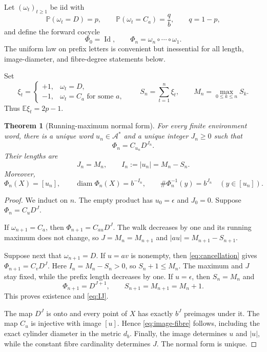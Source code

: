 \documentclass[11pt,a4paper]{amsart}
\newtheorem{theorem}{Theorem}[section]
\theoremstyle{definition}
\theoremstyle{remark}
\newcommand{\A}{\mathcal A}
\newcommand{\Prob}{\mathbb P}
\newcommand{\Exp}{\mathbb E}
\newcommand{\Id}{\operatorname{Id}}
\newcommand{\diam}{\operatorname{diam}}
\newcommand{\cyl}[1]{[#1]}
\begin{document}
Let $(\omega_t)_{t\geq1}$ be iid with
\begin{equation}\label{eq:environment-law}
 \Prob(\omega_t=D)=p,
 \qquad
 \Prob(\omega_t=C_a)=\frac{q}{b},
 \qquad q=1-p,
\end{equation}
and define the forward cocycle
\begin{equation}\label{eq:cocycle}
 \Phi_0=\Id,
 \qquad
 \Phi_n=\omega_n\circ\cdots\circ\omega_1.
\end{equation}
The uniform law on prefix letters is convenient but inessential for all
length, image-diameter, and fibre-degree statements below.

Set
\begin{equation}\label{eq:walk}
 \xi_t=\begin{cases}+1,&\omega_t=D,\\-1,&\omega_t=C_a\text{ for some }a,
 \end{cases}
 \qquad
 S_n=\sum_{t=1}^n\xi_t,
 \qquad
 M_n=\max_{0\leq k\leq n}S_k.
\end{equation}
Thus $\Exp\xi_t=2p-1$.

\begin{theorem}[Running-maximum normal form]\label{thm:normal-form}
For every finite environment word, there is a unique word $u_n\in\A^*$
and a unique integer $J_n\geq0$ such that
\begin{equation}\label{eq:normal-form}
 \Phi_n=C_{u_n}D^{J_n}.
\end{equation}
Their lengths are
\begin{equation}\label{eq:IJ}
 \boxed{\quad J_n=M_n,\qquad I_n:=|u_n|=M_n-S_n.\quad}
\end{equation}
Moreover,
\begin{equation}\label{eq:image-fibre}
 \Phi_n(X)=\cyl{u_n},
 \qquad
 \diam\Phi_n(X)=b^{-I_n},
 \qquad
 \#\Phi_n^{-1}(y)=b^{J_n}\quad(y\in\cyl{u_n}).
\end{equation}
\end{theorem}

\begin{proof}
We induct on $n$.  The empty product has $u_0=\epsilon$ and $J_0=0$.
Suppose $\Phi_n=C_uD^J$.

If $\omega_{n+1}=C_a$, then
$\Phi_{n+1}=C_{au}D^J$.  The walk decreases by one and its running maximum
does not change, so $J=M_n=M_{n+1}$ and
$|au|=M_{n+1}-S_{n+1}$.

Suppose next that $\omega_{n+1}=D$.  If $u=av$ is nonempty, then
\eqref{eq:cancellation} gives
$\Phi_{n+1}=C_vD^J$.  Here $I_n=M_n-S_n>0$, so
$S_n+1\leq M_n$.  The maximum and $J$ stay fixed, while the prefix length
decreases by one.  If $u=\epsilon$, then $S_n=M_n$ and
\[
 \Phi_{n+1}=D^{J+1},\qquad
 S_{n+1}=M_{n+1}=M_n+1.
\]
This proves existence and \eqref{eq:IJ}.

The map $D^J$ is onto and every point of $X$ has exactly $b^J$ preimages
under it.  The map $C_u$ is injective with image $\cyl{u}$.  Hence
\eqref{eq:image-fibre} follows, including the exact cylinder diameter in
the metric $d_b$.  Finally, the image determines $u$ and $|u|$, while the
constant fibre cardinality determines $J$.  The normal form is unique.
\end{proof}
\end{document}

